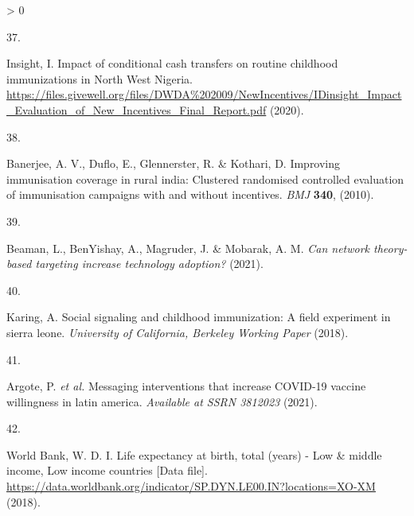 \documentclass[
  12pt,
]{article}
\newlength{\cslhangindent}
\newlength{\csllabelwidth}
\newenvironment{CSLReferences}[2] %
 {%
  \setlength{\parindent}{0pt}
  \ifodd #1 \everypar{\setlength{\hangindent}{\cslhangindent}}\ignorespaces\fi
  \ifnum #2 > 0
  \setlength{\parskip}{#2\baselineskip}
  \fi
 }%
 {}
\newcommand{\CSLLeftMargin}[1]{\parbox[t]{\csllabelwidth}{#1}}
\newcommand{\CSLRightInline}[1]{\parbox[t]{\linewidth - \csllabelwidth}{#1}\break}
\providecommand{\DIFaddbegin}{} %
\providecommand{\DIFaddend}{} %
\providecommand{\DIFdelbegin}{} %
\providecommand{\DIFdelend}{} %
\newcommand{\DIFscaledelfig}{0.5}
\newlength{\DIFdelgraphicswidth} %
\newlength{\DIFdelgraphicsheight} %
\newcommand{\DIFaddincludegraphics}[2][]{{\color{blue}\fbox{\DIFOincludegraphics[#1]{#2}}}} %
\newcommand{\DIFdelincludegraphics}[2][]{%
\sbox{\DIFdelgraphicsbox}{\DIFOincludegraphics[#1]{#2}}%
\settoboxwidth{\DIFdelgraphicswidth}{\DIFdelgraphicsbox} %
\settoboxtotalheight{\DIFdelgraphicsheight}{\DIFdelgraphicsbox} %
\scalebox{\DIFscaledelfig}{%
\parbox[b]{\DIFdelgraphicswidth}{\usebox{\DIFdelgraphicsbox}\\[-\baselineskip] \rule{\DIFdelgraphicswidth}{0em}}\llap{\resizebox{\DIFdelgraphicswidth}{\DIFdelgraphicsheight}{%
\setlength{\unitlength}{\DIFdelgraphicswidth}%
\begin{picture}(1,1)%
\thicklines\linethickness{2pt} %
{\color[rgb]{1,0,0}\put(0,0){\framebox(1,1){}}}%
{\color[rgb]{1,0,0}\put(0,0){\line( 1,1){1}}}%
{\color[rgb]{1,0,0}\put(0,1){\line(1,-1){1}}}%
\end{picture}%
}\hspace*{3pt}}} %
} %
\DeclareRobustCommand{\DIFaddbegin}{\DIFOaddbegin \let\includegraphics\DIFaddincludegraphics} %
\DeclareRobustCommand{\DIFaddend}{\DIFOaddend \let\includegraphics\DIFOincludegraphics} %
\DeclareRobustCommand{\DIFdelbegin}{\DIFOdelbegin \let\includegraphics\DIFdelincludegraphics} %
\DeclareRobustCommand{\DIFdelend}{\DIFOaddend \let\includegraphics\DIFOincludegraphics} %
\begin{document}
\begin{CSLReferences}{0}{0}
\leavevmode\hypertarget{ref-idinsight}{}%
\DIFdelbegin %
\DIFdelend \DIFaddbegin \CSLLeftMargin{37. }
\DIFaddend \CSLRightInline{Insight, I. {Impact of conditional cash transfers on routine childhood immunizations in North West Nigeria}. \url{https://files.givewell.org/files/DWDA\%202009/NewIncentives/IDinsight_Impact_Evaluation_of_New_Incentives_Final_Report.pdf} (2020).}

\leavevmode\hypertarget{ref-Banerjee2010}{}%
\DIFdelbegin %
\DIFdelend \DIFaddbegin \CSLLeftMargin{38. }
\DIFaddend \CSLRightInline{Banerjee, A. V., Duflo, E., Glennerster, R. \& Kothari, D. Improving immunisation coverage in rural india: Clustered randomised controlled evaluation of immunisation campaigns with and without incentives. \emph{BMJ} \textbf{340}, (2010).}

\leavevmode\hypertarget{ref-beaman2021can}{}%
\DIFdelbegin %
\DIFdelend \DIFaddbegin \CSLLeftMargin{39. }
\DIFaddend \CSLRightInline{Beaman, L., BenYishay, A., Magruder, J. \& Mobarak, A. M. \emph{Can network theory-based targeting increase technology adoption?} (2021).}

\leavevmode\hypertarget{ref-karing2018social}{}%
\DIFdelbegin %
\DIFdelend \DIFaddbegin \CSLLeftMargin{40. }
\DIFaddend \CSLRightInline{Karing, A. Social signaling and childhood immunization: A field experiment in sierra leone. \emph{University of California, Berkeley Working Paper} (2018).}

\leavevmode\DIFdelbegin %
\DIFdelend \DIFaddbegin \hypertarget{ref-argote2021messaging}{}\DIFaddend %
\DIFdelbegin %
\DIFdelend \DIFaddbegin \CSLLeftMargin{41. }
\CSLRightInline{Argote, P. \emph{et al.} Messaging interventions that increase COVID-19 vaccine willingness in latin america. \emph{Available at SSRN 3812023} (2021).}
\DIFaddend 

\leavevmode\DIFdelbegin %
\DIFdelend \DIFaddbegin \hypertarget{ref-wbage}{}\DIFaddend %
\DIFdelbegin %
\DIFdelend \DIFaddbegin \CSLLeftMargin{42. }
\CSLRightInline{World Bank, W. D. I. {Life expectancy at birth, total (years) - Low \& middle income, Low income countries {[}Data file{]}}. \url{https://data.worldbank.org/indicator/SP.DYN.LE00.IN?locations=XO-XM} (2018).}
\DIFaddend 


\end{CSLReferences}
\end{document}
